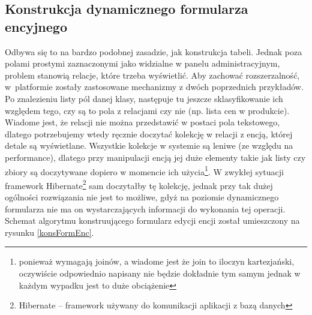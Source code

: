 \newpage
\subsection{Konstrukcja dynamicznego formularza encyjnego} \label{s_konDynForm}
Odbywa się to na bardzo podobnej zasadzie, jak konstrukcja tabeli. Jednak poza polami prostymi zaznaczonymi jako widzialne w panelu administracyjnym, problem stanowią relacje, które trzeba wyświetlić. Aby zachować rozszerzalność, w platformie zostały zastosowane mechanizmy z dwóch poprzednich przykładów. Po znalezieniu listy pól danej klasy, następuje tu jeszcze sklasyfikowanie ich względem tego, czy są to pola z relacjami czy nie (np. lista cen w produkcie). Wiadome jest, że relacji nie można przedstawić w postaci pola tekstowego, dlatego potrzebujemy wtedy ręcznie doczytać kolekcję w relacji z encją, której detale są wyświetlane. Wszystkie kolekcje w systemie są leniwe (ze względu na performance), dlatego przy manipulacji encją jej duże elementy takie jak listy czy zbiory są doczytywane dopiero w momencie ich użycia\footnote{ponieważ wymagają joinów, a wiadome jest że join to iloczyn kartezjański, oczywiście odpowiednio napisany nie będzie dokładnie tym samym jednak w każdym wypadku jest to duże obciążenie}. W zwykłej sytuacji framework Hibernate\footnote{Hibernate -- framework używany do komunikacji aplikacji z bazą danych} sam doczytałby tę kolekcję, jednak przy tak dużej ogólności rozwiązania nie jest to możliwe, gdyż na poziomie dynamicznego formularza nie ma on wystarczających informacji do wykonania tej operacji. Schemat algorytmu konstruującego formularz edycji encji został umieszczony na rysunku \ref{konsFormEnc}.
\newpage
